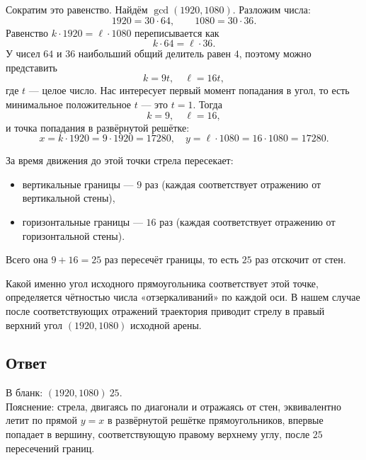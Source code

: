 \documentclass[12pt,a4paper]{article}
\begin{document}
Сократим это равенство. Найдём $\gcd(1920, 1080)$. Разложим числа:
\[
1920 = 30 \cdot 64,\qquad 1080 = 30 \cdot 36.
\]
Равенство $k\cdot 1920 = \ell\cdot 1080$ переписывается как
\[
k \cdot 64 = \ell \cdot 36.
\]
У чисел $64$ и $36$ наибольший общий делитель равен $4$, поэтому можно представить
\[
k = 9t,\quad \ell = 16t,
\]
где $t$ --- целое число. Нас интересует первый момент попадания в угол, то есть минимальное положительное $t$ --- это $t=1$. Тогда
\[
k = 9,\quad \ell = 16,
\]
и точка попадания в развёрнутой решётке:
\[
x = k \cdot 1920 = 9 \cdot 1920 = 17280, \quad y = \ell \cdot 1080 = 16 \cdot 1080 = 17280.
\]

За время движения до этой точки стрела пересекает:
\begin{itemize}
  \item вертикальные границы --- $9$ раз (каждая соответствует отражению от вертикальной стены),
  \item горизонтальные границы --- $16$ раз (каждая соответствует отражению от горизонтальной стены).
\end{itemize}
Всего она $9 + 16 = 25$ раз пересечёт границы, то есть $25$ раз отскочит от стен.

Какой именно угол исходного прямоугольника соответствует этой точке, определяется чётностью числа «отзеркаливаний» по каждой оси. В нашем случае после соответствующих отражений траектория приводит стрелу в правый верхний угол $(1920,1080)$ исходной арены.

\subsection*{Ответ}
В бланк: $(1920,1080)\ 25$.\\
Пояснение: стрела, двигаясь по диагонали и отражаясь от стен, эквивалентно летит по прямой $y = x$ в развёрнутой решётке прямоугольников, впервые попадает в вершину, соответствующую правому верхнему углу, после $25$ пересечений границ.
\end{document}
